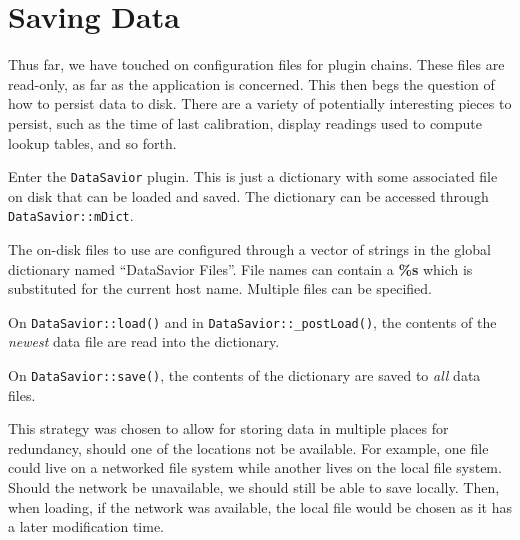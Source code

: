 
\section{Saving Data}

Thus far, we have touched on configuration files for plugin chains.
These files are read-only, as far as the application is concerned. 
This then begs the question of how to persist data to disk. There
are a variety of potentially interesting pieces to persist, such
as the time of last calibration, display readings used to compute
lookup tables, and so forth.

Enter the {\tt DataSavior} plugin. This is just a dictionary with
some associated file on disk that can be loaded and saved.  The
dictionary can be accessed through {\tt DataSavior::mDict}.

The on-disk files to use are configured through a vector of strings
in the global dictionary named ``DataSavior Files''. File names
can contain a {\bf \%s} which is substituted for the current 
host name. Multiple files can be specified.

On {\tt DataSavior::load()} and in {\tt DataSavior::\_postLoad()}, 
the contents of the {\em newest} data file are read into the dictionary. 

On {\tt DataSavior::save()}, the contents of the dictionary are 
saved to {\em all} data files.

This strategy was chosen to allow for storing data in multiple places
for redundancy, should one of the locations not be available. For 
example, one file could live on a networked file system while another
lives on the local file system. Should the network be unavailable,
we should still be able to save locally. Then, when loading, if
the network was available, the local file would be chosen as it 
has a later modification time.

